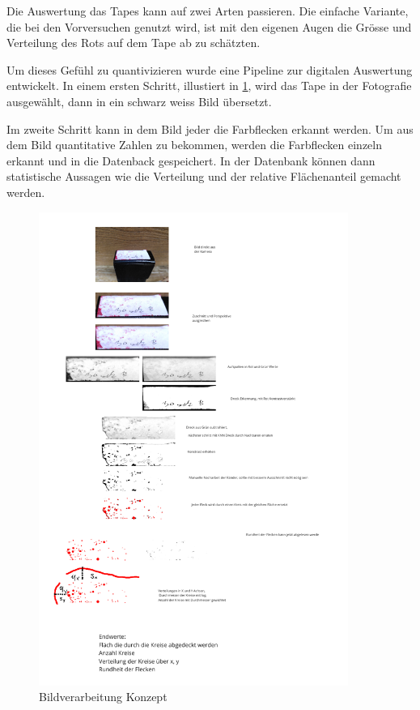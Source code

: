 Die Auswertung das Tapes kann auf zwei Arten passieren. Die einfache Variante, die bei den Vorversuchen genutzt wird, ist mit den eigenen Augen die Grösse und Verteilung des Rots auf dem Tape ab zu schätzten.

Um dieses Gefühl zu quantivizieren wurde eine Pipeline zur digitalen Auswertung entwickelt. In einem ersten Schritt, illustiert in \ref{fig:Bildverarbeitnugskonzpet}, wird das Tape in der Fotografie ausgewählt, dann in ein schwarz weiss Bild übersetzt.

Im zweite Schritt kann in dem Bild jeder die Farbflecken erkannt werden. Um aus dem Bild quantitative Zahlen zu bekommen, werden die Farbflecken einzeln erkannt und in die Datenback gespeichert. In der Datenbank können dann statistische Aussagen wie die Verteilung und der relative Flächenanteil gemacht werden.

\begin{figure}
    \centering
    \includegraphics[width=0.9\textwidth]{Bilder/Screenshotfrom2024-04-0112-59-42.png}
    \caption{Bildverarbeitung Konzept}
    \label{fig:Bildverarbeitnugskonzpet}
\end{figure}

\newpage
